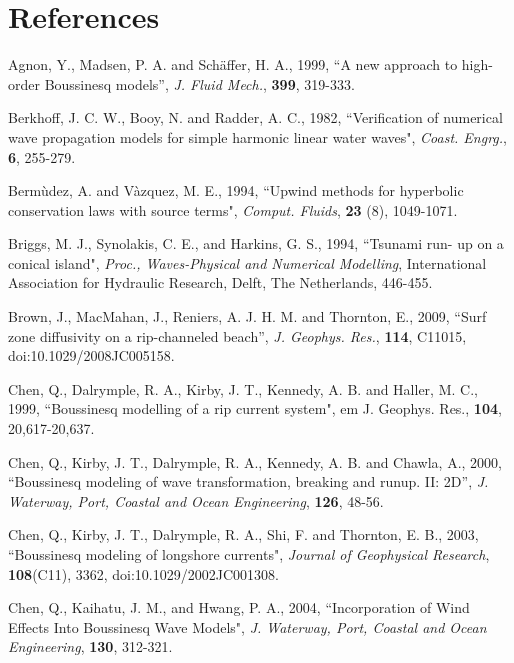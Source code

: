 \documentclass[11pt]{article}
\begin{document}
\section{References}

\begin{description}

\item Agnon, Y., Madsen, P. A. and Sch\"{a}ffer, H. A., 1999, ``A new approach to high-order Boussinesq models'', {\em J. Fluid Mech.}, {\bf 399}, 319-333.

\item Berkhoff, J. C. W., Booy, N. and Radder, A. C., 1982, ``Verification of numerical wave propagation models for simple harmonic linear water waves", {\em Coast. Engrg.}, {\bf 6}, 255-279.

\item Berm\`{u}dez, A. and  V\`{a}zquez, M. E., 1994, ``Upwind methods for hyperbolic conservation laws with source terms", {\em Comput. Fluids}, {\bf 23} (8), 1049-1071.

\item Briggs, M. J., Synolakis, C. E., and Harkins, G. S., 1994,  ``Tsunami run- up on a conical island",  {\em Proc., Waves-Physical and Numerical Modelling}, International Association for Hydraulic Research, Delft, The Netherlands, 446-455.

\item Brown, J., MacMahan, J.,   Reniers, A. J. H. M. and Thornton, E., 2009, ``Surf zone diffusivity on a rip-channeled beach'', {\em J. Geophys. Res.}, {\bf 114}, C11015, doi:10.1029/2008JC005158.

\item Chen, Q., Dalrymple, R. A.,   Kirby, J. T.,  Kennedy, A. B.  and  Haller, M. C., 1999, ``Boussinesq modelling of a rip current system",  {em J. Geophys. Res.}, {\bf 104}, 20,617-20,637.

\item Chen, Q., Kirby, J. T., Dalrymple, R. A., Kennedy, A. B. and Chawla, A., 2000, ``Boussinesq modeling of wave transformation, breaking and runup.  II: 2D'', {\em J. Waterway, Port, Coastal and Ocean Engineering}, {\bf 126}, 48-56.

\item Chen, Q., Kirby, J. T., Dalrymple, R. A., Shi, F. and Thornton, E. B., 2003, ``Boussinesq modeling of longshore currents", {\em Journal of Geophysical Research}, {\bf 108}(C11), 3362, doi:10.1029/2002JC001308.

\item Chen, Q., Kaihatu, J. M., and Hwang, P. A., 2004, ``Incorporation of Wind Effects Into Boussinesq Wave Models", {\em J. Waterway, Port, Coastal and Ocean Engineering}, {\bf 130}, 312-321.


\end{description}
\end{document}
